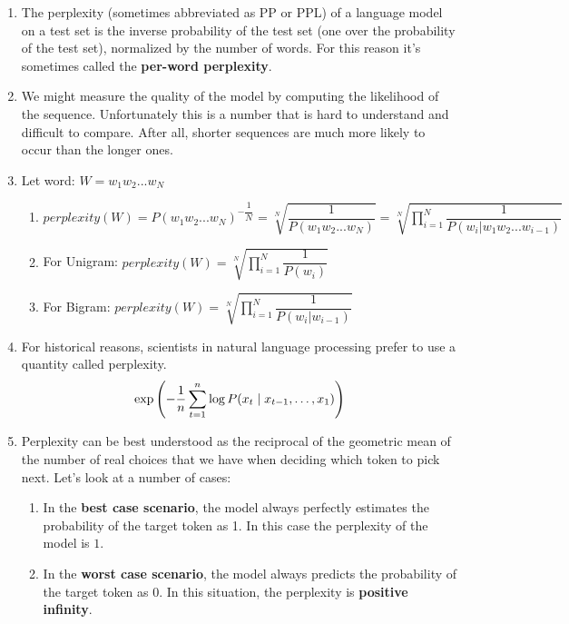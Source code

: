 \begin{enumerate}
    \item The perplexity (sometimes abbreviated as PP or PPL) of a language model on a test set is the inverse probability of the test set (one over the probability of the test set), normalized by the number of words. For this reason it’s sometimes called the \textbf{per-word perplexity}.

    \item We might measure the quality of the model by computing the likelihood of the sequence. Unfortunately this is a number that is hard to understand and difficult to compare. After all, shorter sequences are much more likely to occur than the longer ones. \cite{dnn-1}

    \item Let word: \(W = w_1w_2 ...w_N\)
    \begin{enumerate}
        \item $perplexity(W) = P(w_1w_2 ...w_N)^{-\dfrac{1}{N}} = \sqrt[N]{\dfrac{1}{P(w_1w_2 ...w_N)}} = \sqrt[N]{\prod_{i=1}^{N} \dfrac{1}{P(w_i|w_1w_2 ...w_{i-1})}}$

        \item For Unigram:
        \(
           \displaystyle perplexity(W) = \sqrt[N]{\prod_{i=1}^{N} \dfrac{1}{P(w_i)}}
        \)
        
        \item For Bigram:
        \(
           \displaystyle perplexity(W) = \sqrt[N]{\prod_{i=1}^{N} \dfrac{1}{P(w_i|w_{i-1})}}
        \)
    \end{enumerate}

    \item For historical reasons, scientists in natural language processing prefer to use a quantity called perplexity. \cite{dnn-1}
    \[
        \exp\left(-\dfrac{1}{n} \displaystyle\sum_{t=1}^n \log P(x_t \mid x_{t-1}, \ldots, x_1)\right)
    \]

    \item Perplexity can be best understood as the reciprocal of the geometric mean of the number of real choices that we have when deciding which token to pick next. Let’s look at a number of cases:
    \begin{enumerate}
        \item In the \textbf{best case scenario}, the model always perfectly estimates the probability of the target token as 1. In this case the perplexity of the model is $1$.

        \item In the \textbf{worst case scenario}, the model always predicts the probability of the target token as 0. In this situation, the perplexity is \textbf{positive infinity}.


\end{enumerate}
\end{enumerate}
